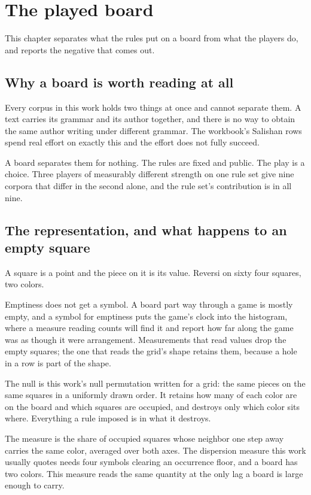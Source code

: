 \chapter{The played board}

This chapter separates what the rules put on a board from what the players do, and reports the
negative that comes out.

\section{Why a board is worth reading at all}

Every corpus in this work holds two things at once and cannot separate them. A text carries its
grammar and its author together, and there is no way to obtain the same author writing under
different grammar. The workbook's Salishan rows~\cite{src:Quigg-orior-workbook} spend real effort on exactly this and the effort does
not fully succeed.

A board separates them for nothing. The rules are fixed and public. The play is a choice. Three
players of measurably different strength on one rule set give nine corpora that differ in the second
alone, and the rule set's contribution is in all nine.

\section{The representation, and what happens to an empty square}

A square is a point and the piece on it is its value. Reversi on sixty four squares, two colors.

Emptiness does not get a symbol. A board part way through a game is mostly empty, and a symbol for
emptiness puts the game's clock into the histogram, where a measure reading counts will find it and
report how far along the game was as though it were arrangement. Measurements that read values drop
the empty squares; the one that reads the grid's shape retains them, because a hole in a row is part
of the shape.

The null is this work's null permutation written for a grid: the same pieces on the same squares in
a uniformly drawn order. It retains how many of each color are on the board and which squares are
occupied, and destroys only which color sits where. Everything a rule imposed is in what it
destroys.

The measure is the share of occupied squares whose neighbor one step away carries the same color,
averaged over both axes. The dispersion measure this work usually quotes needs four symbols clearing
an occurrence floor, and a board has two colors. This measure reads the same quantity at the only lag
a board is large enough to carry.


